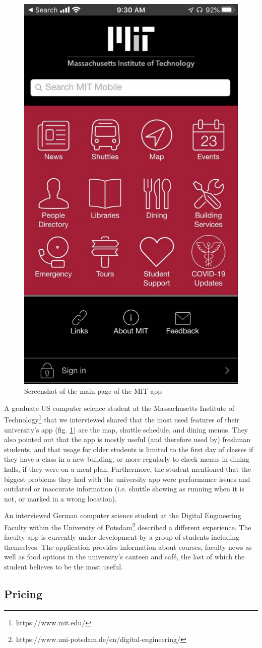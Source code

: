         \begin{figure}
            \centering
            \includegraphics[width=0.25\columnwidth]{figures/uni_apps/screenshots/mit.jpg}
            \captionsetup{labelsep=space, textformat=empty}
            \caption{Screenshot of the main page of the MIT app}
            \label{2:fig:mit_screenshot}
        \end{figure}
        
        A graduate US computer science student at the Massachusetts Institute of Technology\footnote{https://www.mit.edu/} that we interviewed shared that the most used features of their university's app (fig. \ref{2:fig:mit_screenshot}) are the map, shuttle schedule, and dining menus. They also pointed out that the app is mostly useful (and therefore used by) freshman students, and that usage for older students is limited to the first day of classes if they have a class in a new building, or more regularly to check menus in dining halls, if they were on a meal plan. Furthermore, the student mentioned that the biggest problems they had with the university app were performance issues and outdated or inaccurate information (i.e. shuttle showing as running when it is not, or marked in a wrong location).
        
        An interviewed German computer science student at the Digital Engineering Faculty within the University of Potsdam\footnote{https://www.uni-potsdam.de/en/digital-engineering/} described a different experience. The faculty app is currently under development by a group of students including themselves. The application provides information about courses, faculty news as well as food options in the university's canteen and café, the last of which the student believes to be the most useful.
        
    \subsection{Pricing} \label{2:uni_apps_pricing}
    
